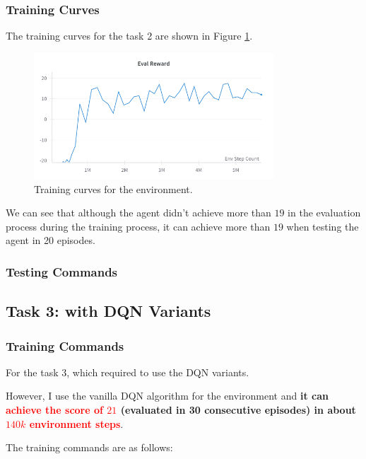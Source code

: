\subsubsection{Training Curves}

The training curves for the task 2 are shown in Figure \ref{fig:pong-vanilla-training-curve}.

\begin{figure}[H]
    \centering
    \includegraphics[width=0.8\textwidth]{figures/task2.png}
    \caption{Training curves for the \pong environment.}
    \label{fig:pong-vanilla-training-curve}
\end{figure}

We can see that although the agent didn't achieve more than $19$ in the evaluation process during the training process, it can achieve more than $19$ when testing the agent in 20 episodes.

\subsubsection{Testing Commands}

\subsection{Task 3: \pong with DQN Variants}

\subsubsection{Training Commands}

For the task 3, which required to use the DQN variants.

However, I use the vanilla DQN algorithm for the \pong environment and \textbf{it can \textcolor{red}{achieve the score of $21$} (evaluated in 30 consecutive episodes) in about \textcolor{red}{$140k$ environment steps}}.

The training commands are as follows:

